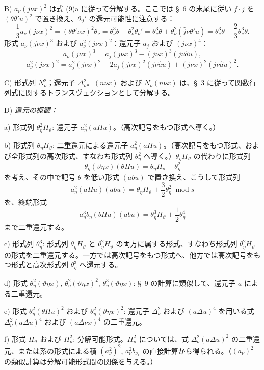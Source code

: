 \documentclass[11pt]{article}
\newcommand{\A}{\Delta}
\newcommand{\modu}[1]{\;\operatorname{mod} #1}
\begin{document}
\noindent B) $a_\nu(j\nu x)^2$ は式 (9)a に従って分解する。ここでは \S\ 6 の末尾に従い $f\cdot j$ を $(\theta\theta'u)^2$ で置き換え、$\theta_\vartheta'$ の還元可能性に注意する：
\[
\frac13a_\nu(j\nu x)^2=(\theta\theta'\nu x)^2\theta_\nu
=\theta_\nu^3\theta-\theta_\nu^2\theta_\nu'
=\theta_\nu^3\theta+\theta_\nu^2(\widehat{j}\nu\theta'u)
=\theta_\nu^3\theta-\frac23\theta_\nu^3\theta.
\]
形式 $a_\nu(j\nu x)^3$ および $a_\nu^2(j\nu x)^2$：還元子 $a_j$ および $(j\nu x)^4$：
\[
a_\nu(j\nu x)^3=a_j(j\nu x)^3-(j\nu x)^3(j\nu\widehat{a}u),
\]
\[
a_\nu^2(j\nu x)^2=a_j^2(j\nu x)^2-2a_j(j\nu x)^2(j\nu\widehat{a}u)+(j\nu x)^2(j\nu\widehat{a}u)^2.
\]

\noindent C) 形式列 $N_\nu^2$；還元子 $\A_\nu^2$。$(n\nu x)$ および $N_\nu(n\nu x)$ は、\S\ 3 に従って関数行列式に関するトランスヴェクションとして分解する。

\noindent D) \emph{還元の概観：}

a) 形式列 $\theta_\eta^2H_\vartheta$: 還元子 $a_\eta^2(aHu)$。（高次記号をもつ形式へ導く。）

b) 形式列 $\theta_\eta H_\vartheta$: 二重還元による還元子 $a_\eta^2(aHu)$。（高次記号をもつ形式、および全形式列の高次形式、すなわち形式列 $\theta_\eta^2$ へ導く。）$\theta_\eta H_\vartheta$ の代わりに形式列
\[
\theta_\eta(\vartheta\eta x)(\theta Hu)=\theta_\eta H_\vartheta+\theta_\eta^2
\]
を考え、その中で記号 $\theta$ を低い形式 $(abu)$ で置き換え、こうして形式列
\[
a_\eta^2(aHu)(abu)=\theta_\eta H_\vartheta+\frac32\theta_\eta^2\modu{s}
\]
を、終端形式
\[
a_\eta^3b_\eta(bHu)(abu)=\theta_\eta^3H_\vartheta+\frac12\theta_\eta^4
\]
まで二重還元する。

c) 形式列 $\theta_\eta^3$: 形式列 $\theta_\eta H_\vartheta$ と $\theta_\eta^2H_\vartheta$ の両方に属する形式、すなわち形式列 $\theta_\eta^2H_\vartheta$ の形式を二重還元する。一方では高次記号をもつ形式へ、他方では高次記号をもつ形式と高次形式列 $\theta_\eta^3$ へ還元する。

d) 形式 $\theta_\eta^2(\vartheta\eta x)$, $\theta_\eta^2(\vartheta\eta x)^2$, $\theta_\eta^3(\vartheta\eta x)$: \S\ 9 の計算に類似して、還元子 $a$ による二重還元。

e) 形式 $\theta_\eta^2(\theta Hu)^2$ および $\theta_\eta^2(\vartheta\eta x)^2$: 還元子 $\A_\nu^2$ および $(a\A u)^4$ を用いる式 $\A_\nu^2(a\A u)^4$ および $(a\A\nu x)^4$ の二重還元。

f) 形式 $H_\vartheta$ および $H_\vartheta^2$: 分解可能形式。$H_\vartheta^2$ については、式 $\A_\nu^2(a\A u)^2$ の二重還元、または系の形式による積 $(a_\nu^2)^2$, $a_\nu^2b_{\nu_1}$ の直接計算から得られる。（$(a_\nu)^2$ の類似計算は分解可能形式間の関係を与える。）
\end{document}
